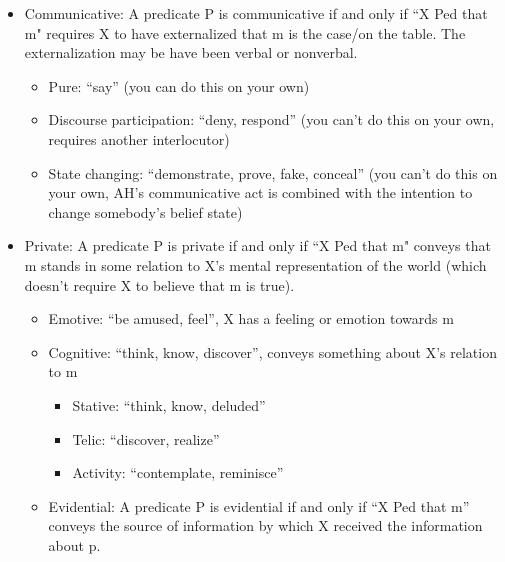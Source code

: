 \documentclass[11pt,fleqn]{article}
\newcommand{\6}{\mbox{$[\hspace*{-.6mm}[$}}
\newcommand{\9}{\mbox{$]\hspace*{-.6mm}]$}}
\begin{document}
\begin{itemize}

\item Communicative: A predicate P is communicative if and only if ``X Ped that m" requires X to have externalized that m is the case/on the table. The externalization may be have been verbal or nonverbal. 

\begin{itemize}

\item Pure: ``say'' (you can do this on your own)

\item Discourse participation: ``deny, respond'' (you can't do this on your own, requires another interlocutor)

\item State changing: ``demonstrate, prove, fake, conceal'' (you can't do this on your own, AH's communicative act is combined with the intention to change somebody's belief state)

\end{itemize}

\item Private: A predicate P is private if and only if ``X Ped that m" conveys that m stands in some relation to X's mental representation of the world (which doesn't require X to believe that m is true).

\begin{itemize}

\item Emotive: ``be amused, feel'', X has a feeling or emotion towards m

\item Cognitive: ``think, know, discover'', conveys something about X's relation to m

\begin{itemize}

\item Stative: ``think, know, deluded''

\item Telic: ``discover, realize''

\item Activity: ``contemplate, reminisce'' 

\end{itemize}

\item Evidential: A predicate P is evidential if and only if ``X Ped that m'' conveys the source of information by which X received the information about p.


\end{itemize}
\end{itemize}
\end{document}
